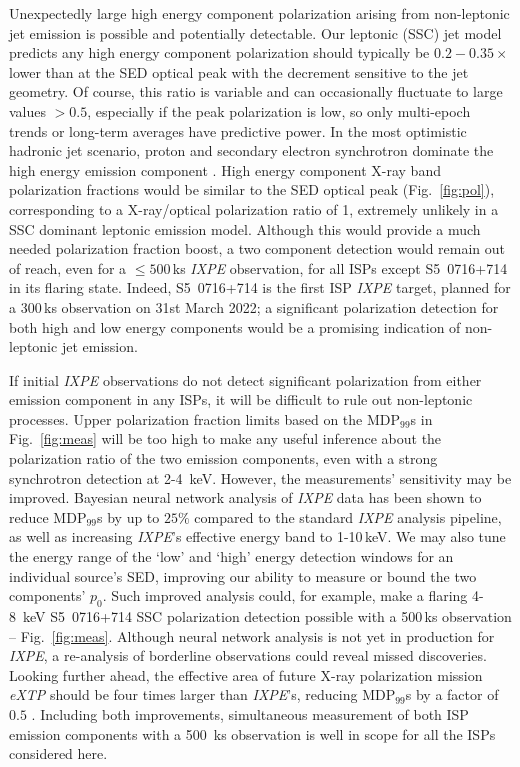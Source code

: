Unexpectedly large high energy component polarization arising from non-leptonic jet emission is possible and potentially detectable. Our leptonic (SSC) jet model predicts any high energy component polarization should typically be $0.2-0.35 \times$ lower than at the SED optical peak \citep{peirson_polarization_2019} with the decrement sensitive to the jet geometry. Of course, this ratio is variable and can occasionally fluctuate to large values $>0.5$, especially if the peak polarization is low, so only multi-epoch trends or long-term averages have predictive power.
In the most optimistic hadronic jet scenario, proton and secondary electron synchrotron dominate the high energy emission component \citep{zhang_x-ray_2013, gao_modelling_2019}. High energy component X-ray band polarization fractions would be similar to the SED optical peak (Fig.~\ref{fig:pol}), corresponding to a X-ray/optical polarization ratio of 1, extremely unlikely in a SSC dominant leptonic emission model. Although this would provide a much needed polarization fraction boost, a two component detection would remain out of reach, even for a $\leq500$\,ks {\it IXPE} observation, for all ISPs except S5~0716+714 in its flaring state. 
Indeed, S5~0716+714 is the first ISP {\it IXPE} target, planned for a 300\,ks observation on 31st March 2022; a significant polarization detection for both high and low energy components would be a promising indication of non-leptonic jet emission.

If initial {\it IXPE} observations do not detect significant polarization from either emission component in any ISPs, it will be difficult to rule out non-leptonic processes. Upper polarization fraction limits based on the MDP$_{99}$s in Fig.~\ref{fig:meas} will be too high to make any useful inference about the polarization ratio of the two emission components, even with a strong synchrotron detection at 2-4~keV. However, the measurements' sensitivity may be improved. Bayesian neural network analysis of {\it IXPE} data \citep{peirson_deep_2021, peirson_towards_2021} has been shown to reduce MDP$_{99}$s by up to $25\%$ compared to the standard {\it IXPE} analysis pipeline, as well as increasing {\it IXPE}'s effective energy band to 1-10\,keV. We may also tune the energy range of the `low' and `high' energy detection windows for an individual source's SED, improving our ability to measure or bound the two components' $p_0$. Such improved analysis could, for example, make a flaring 4-8~keV S5~0716+714 SSC polarization detection possible with a 500\,ks observation -- Fig.~\ref{fig:meas}. Although neural network analysis is not yet in production for {\it IXPE}, a re-analysis of borderline observations could reveal missed discoveries. Looking further ahead, the effective area of future X-ray polarization mission {\it eXTP} \citep{zhang_enhanced_2018} should be four times larger than {\it IXPE}'s, reducing MDP$_{99}$s by a factor of $0.5$ \citep{di_gesu_prospects_2020}. Including both improvements, simultaneous measurement of both ISP emission components with a 500~ks observation is well in scope for all the ISPs considered here.